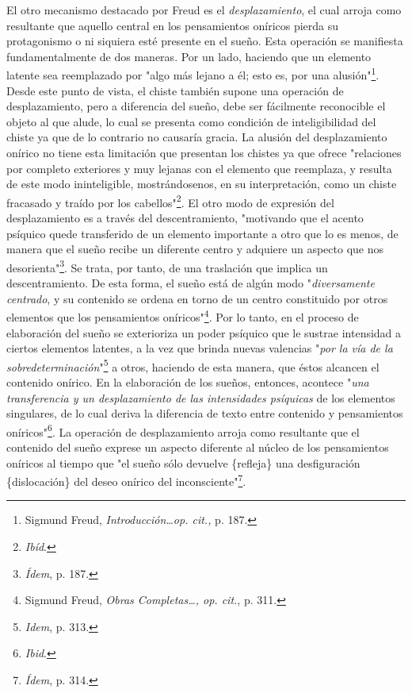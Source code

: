 \documentclass{book}
\begin{document}
El otro mecanismo destacado por Freud es el \emph{desplazamiento}, el
cual arroja como resultante que aquello central en los pensamientos
oníricos pierda su protagonismo o ni siquiera esté presente en el sueño.
Esta operación se manifiesta fundamentalmente de dos maneras. Por un
lado, haciendo que un elemento latente sea reemplazado por "algo más
lejano a él; esto es, por una alusión"\footnote{Sigmund Freud,
  \emph{Introducción\ldots op. cit.,} p. 187.}. Desde este punto de
vista, el chiste también supone una operación de desplazamiento, pero a
diferencia del sueño, debe ser fácilmente reconocible el objeto al que
alude, lo cual se presenta como condición de inteligibilidad del chiste
ya que de lo contrario no causaría gracia. La alusión del desplazamiento
onírico no tiene esta limitación que presentan los chistes ya que ofrece
"relaciones por completo exteriores y muy lejanas con el elemento que
reemplaza, y resulta de este modo ininteligible, mostrándosenos, en su
interpretación, como un chiste fracasado y traído por los
cabellos"\footnote{\emph{Ibíd}.}. El otro modo de expresión del
desplazamiento es a través del descentramiento, "motivando que el acento
psíquico quede transferido de un elemento importante a otro que lo es
menos, de manera que el sueño recibe un diferente centro y adquiere un
aspecto que nos desorienta"\footnote{\emph{Ídem}, p. 187.}. Se trata,
por tanto, de una traslación que implica un descentramiento. De esta
forma, el sueño está de algún modo "\emph{diversamente centrado}, y su
contenido se ordena en torno de un centro constituido por otros
elementos que los pensamientos oníricos"\footnote{Sigmund Freud,
  \emph{Obras Completas\ldots, op. cit.}, p. 311.}. Por lo tanto, en el
proceso de elaboración del sueño se exterioriza un poder psíquico que le
sustrae intensidad a ciertos elementos latentes, a la vez que brinda
nuevas valencias "\emph{por la vía de la sobredeterminación}"\footnote{\emph{Idem},
  p. 313.} a otros, haciendo de esta manera, que éstos alcancen el
contenido onírico. En la elaboración de los sueños, entonces, acontece
"\emph{una transferencia y un desplazamiento de las intensidades
psíquicas} de los elementos singulares, de lo cual deriva la diferencia
de texto entre contenido y pensamientos oníricos"\footnote{\emph{Ibid}.}.
La operación de desplazamiento arroja como resultante que el contenido
del sueño exprese un aspecto diferente al núcleo de los pensamientos
oníricos al tiempo que "el sueño sólo devuelve \{refleja\} una
desfiguración \{dislocación\} del deseo onírico del
inconsciente"\footnote{\emph{Ídem}, p. 314.}.
\end{document}
